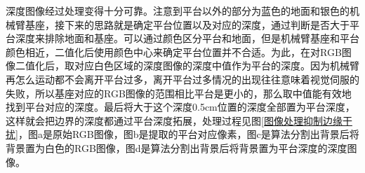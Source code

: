 \documentclass[fontset=fandol,type=bachelor,campus=harbin,bsmainpagenumberline=true]{hithesisbook}
\begin{document}
深度图像经过处理变得十分可靠。注意到平台以外的部分为蓝色的地面和银色的机械臂基座，接下来的思路就是确定平台位置以及对应的深度，通过判断是否大于平台深度来排除地面和基座。可以通过颜色区分平台和地面，但是机械臂基座和平台颜色相近，二值化后使用颜色中心来确定平台位置并不合适。为此，在对RGB图像二值化后，取对应白色区域的深度图像的深度中值作为平台的深度。因为机械臂再怎么运动都不会离开平台过多，离开平台过多情况的出现往往意味着视觉伺服的失败，所以基座对应的RGB图像的范围相比平台是更小的，那么取中值能有效地找到平台对应的深度。最后将大于这个深度0.5cm位置的深度全部置为平台深度，这样就会把边界的深度都通过平台深度拓展，处理过程见图\ref{图像处理抑制边缘干扰}，图a是原始RGB图像，图b是提取的平台对应像素，图c是算法分割出背景后将背景置为白色的RGB图像，图d是算法分割出背景后将背景置为平台深度的深度图像。
\newpage
\begin{figure}[h]
	\centering
\end{figure}
\end{document}
